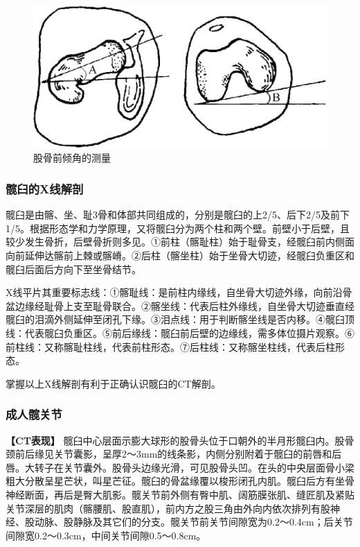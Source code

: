 \begin{figure}[!htbp]
 \centering
 \includegraphics[width=.7\textwidth,height=\textheight,keepaspectratio]{./images/Image00418.jpg}
 \captionsetup{justification=centering}
 \caption{股骨前倾角的测量}
 \label{fig22-2}
  \end{figure} 

\subsubsection{髋臼的X线解剖}

髋臼是由髂、坐、耻3骨和体部共同组成的，分别是髋臼的上2/5、后下2/5及前下1/5。根据形态学和力学原理，又将髋臼分为两个柱和两个壁。前壁小于后壁，且较少发生骨折，后壁骨折则多见。①前柱（髂耻柱）始于耻骨支，经髋臼前内侧面向前延伸达髂前上棘或髂嵴。②后柱（髂坐柱）始于坐骨大切迹，经髋臼负重区和髋臼后面后方向下至坐骨结节。

X线平片其重要标志线：①髂耻线：是前柱内缘线，自坐骨大切迹外缘，向前沿骨盆边缘经耻骨上支至耻骨联合。②髂坐线：代表后柱外缘线，自坐骨大切迹垂直经髋臼的泪滴外侧延伸至闭孔下缘。③泪点线：用于判断髂坐线是否内移。④髋臼顶线：代表髋臼负重区。⑤前后缘线：髋臼前后壁的边缘线，需多体位摄片观察。⑥前柱线：又称髂耻柱线，代表前柱形态。⑦后柱线：又称髂坐柱线，代表后柱形态。

掌握以上X线解剖有利于正确认识髋臼的CT解剖。

\subsubsection{成人髋关节}

\textbf{【CT表现】}
髋臼中心层面示膨大球形的股骨头位于口朝外的半月形髋臼内。股骨颈前后缘见关节囊影，呈厚2～3mm的线条影，内侧分别附着于髋臼的前唇和后唇。大转子在关节囊外。股骨头边缘光滑，可见股骨头凹。在头的中央层面骨小梁粗大分散呈星芒状，叫星芒征。髋臼的骨盆缘覆以梭形闭孔内肌。髋臼后方有坐骨神经断面，再后是臀大肌影。髋关节前外侧有臀中肌、阔筋膜张肌、缝匠肌及紧贴关节深层的肌肉（髂腰肌、股直肌），前内方之股三角由外向内依次排列有股神经、股动脉、股静脉及其它们的分支。髋关节前关节间隙宽为0.2～0.4cm；后关节间隙宽0.2～0.3cm，中间关节间隙0.5～0.8cm。

